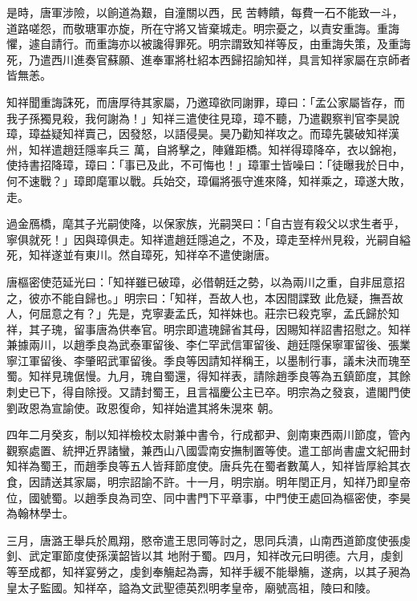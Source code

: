 \begin{pinyinscope}
 是時，唐軍涉險，以餉道為艱，自潼關以西，民
 苦轉饋，每費一石不能致一斗，道路嗟怨，而敬瑭軍亦旋，所在守將又皆棄城走。明宗憂之，以責安重誨。重誨懼，遽自請行。而重誨亦以被讒得罪死。明宗謂致知祥等反，由重誨失策，及重誨死，乃遣西川進奏官蘇願、進奉軍將杜紹本西歸招諭知祥，具言知祥家屬在京師者皆無恙。



 知祥聞重誨誅死，而唐厚待其家屬，乃邀璋欲同謝罪，璋曰：「孟公家屬皆存，而我子孫獨見殺，我何謝為！」知祥三遣使往見璋，璋不聽，乃遣觀察判官李昊說璋，璋益疑知祥賣己，因發怒，以語侵昊。昊乃勸知祥攻之。而璋先襲破知祥漢州，知祥遣趙廷隱率兵三
 萬，自將擊之，陣雞距橋。知祥得璋降卒，衣以錦袍，使持書招降璋，璋曰：「事已及此，不可悔也！」璋軍士皆噪曰：「徒曝我於日中，何不速戰？」璋即麾軍以戰。兵始交，璋偏將張守進來降，知祥乘之，璋遂大敗，走。



 過金鴈橋，麾其子光嗣使降，以保家族，光嗣哭曰：「自古豈有殺父以求生者乎，寧俱就死！」因與璋俱走。知祥遣趙廷隱追之，不及，璋走至梓州見殺，光嗣自縊死，知祥遂並有東川。然自璋死，知祥卒不遣使謝唐。



 唐樞密使范延光曰：「知祥雖已破璋，必借朝廷之勢，以為兩川之重，自非屈意招之，彼亦不能自歸也。」明宗曰：「知祥，吾故人也，本因間諜致
 此危疑，撫吾故人，何屈意之有？」先是，克寧妻孟氏，知祥妹也。莊宗已殺克寧，孟氏歸於知祥，其子瑰，留事唐為供奉官。明宗即遣瑰歸省其母，因賜知祥詔書招慰之。知祥兼據兩川，以趙季良為武泰軍留後、李仁罕武信軍留後、趙廷隱保寧軍留後、張業寧江軍留後、李肇昭武軍留後。季良等因請知祥稱王，以墨制行事，議未決而瑰至蜀。知祥見瑰倨慢。九月，瑰自蜀還，得知祥表，請除趙季良等為五鎮節度，其餘刺史已下，得自除授。又請封蜀王，且言福慶公主已卒。明宗為之發哀，遣閣門使劉政恩為宣諭使。政恩復命，知祥始遣其將朱滉來
 朝。



 四年二月癸亥，制以知祥檢校太尉兼中書令，行成都尹、劍南東西兩川節度，管內觀察處置、統押近界諸蠻，兼西山八國雲南安撫制置等使。遣工部尚書盧文紀冊封知祥為蜀王，而趙季良等五人皆拜節度使。唐兵先在蜀者數萬人，知祥皆厚給其衣食，因請送其家屬，明宗詔諭不許。十一月，明宗崩。明年閏正月，知祥乃即皇帝位，國號蜀。以趙季良為司空、同中書門下平章事，中門使王處回為樞密使，李昊為翰林學士。



 三月，唐潞王舉兵於鳳翔，愍帝遣王思同等討之，思同兵潰，山南西道節度使張虔釗、武定軍節度使孫漢韶皆以其
 地附于蜀。四月，知祥改元曰明德。六月，虔釗等至成都，知祥宴勞之，虔釗奉觴起為壽，知祥手緩不能舉觴，遂病，以其子昶為皇太子監國。知祥卒，謚為文武聖德英烈明孝皇帝，廟號高祖，陵曰和陵。




\end{pinyinscope}

